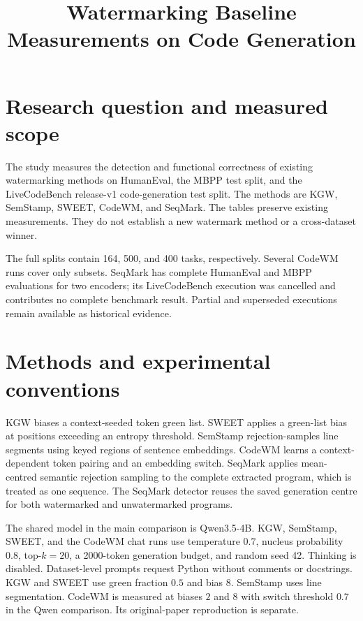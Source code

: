 \documentclass[11pt]{article}
\title{Watermarking Baseline Measurements on Code Generation}
\author{}
\date{}
\begin{document}
\maketitle

\section{Research question and measured scope}

The study measures the detection and functional correctness of existing
watermarking methods on HumanEval, the MBPP test split, and the LiveCodeBench
release-v1 code-generation test split. The methods are KGW, SemStamp, SWEET,
CodeWM, and SeqMark. The tables preserve existing measurements. They do not
establish a new watermark method or a cross-dataset winner.

The full splits contain 164, 500, and 400 tasks, respectively. Several CodeWM
runs cover only subsets. SeqMark has complete HumanEval and MBPP evaluations
for two encoders; its LiveCodeBench execution was cancelled and contributes
no complete benchmark result. Partial and superseded executions remain
available as historical evidence.

\section{Methods and experimental conventions}

KGW biases a context-seeded token green list. SWEET applies a green-list bias
at positions exceeding an entropy threshold. SemStamp rejection-samples
line segments using keyed regions of sentence embeddings. CodeWM learns a
context-dependent token pairing and an embedding switch. SeqMark applies
mean-centred semantic rejection sampling to the complete extracted program,
which is treated as one sequence. The SeqMark detector reuses the saved
generation centre for both watermarked and unwatermarked programs.

The shared model in the main comparison is Qwen3.5-4B. KGW, SemStamp, SWEET,
and the CodeWM chat runs use temperature $0.7$, nucleus probability $0.8$,
top-$k=20$, a 2000-token generation budget, and random seed 42. Thinking is
disabled. Dataset-level prompts request Python without comments or docstrings.
KGW and SWEET use green fraction $0.5$ and bias $8$. SemStamp uses line
segmentation. CodeWM is measured at biases $2$ and $8$ with switch threshold
$0.7$ in the Qwen comparison. Its original-paper reproduction is separate.
\end{document}
